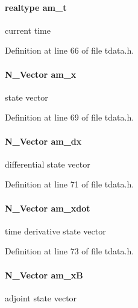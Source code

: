 \paragraph[{am\+\_\+t}]{\setlength{\rightskip}{0pt plus 5cm}realtype am\+\_\+t}\label{struct_temp_data_ae0484650df254ad9cd8883e2ba028892}
current time 

Definition at line 66 of file tdata.\+h.

\hypertarget{struct_temp_data_a4527d9abde45ba3982c35d2c12969d36}{}
\paragraph[{am\+\_\+x}]{\setlength{\rightskip}{0pt plus 5cm}N\+\_\+\+Vector am\+\_\+x}\label{struct_temp_data_a4527d9abde45ba3982c35d2c12969d36}
state vector 

Definition at line 69 of file tdata.\+h.

\hypertarget{struct_temp_data_ac10ec733609d33c557d48c1cc4c9f6f1}{}
\paragraph[{am\+\_\+dx}]{\setlength{\rightskip}{0pt plus 5cm}N\+\_\+\+Vector am\+\_\+dx}\label{struct_temp_data_ac10ec733609d33c557d48c1cc4c9f6f1}
differential state vector 

Definition at line 71 of file tdata.\+h.

\hypertarget{struct_temp_data_abad4a9e3cc9cd42b3fe4e2fe28a915c1}{}
\paragraph[{am\+\_\+xdot}]{\setlength{\rightskip}{0pt plus 5cm}N\+\_\+\+Vector am\+\_\+xdot}\label{struct_temp_data_abad4a9e3cc9cd42b3fe4e2fe28a915c1}
time derivative state vector 

Definition at line 73 of file tdata.\+h.

\hypertarget{struct_temp_data_a318f0b9b1f4b33326184a350912c6fb1}{}
\paragraph[{am\+\_\+x\+B}]{\setlength{\rightskip}{0pt plus 5cm}N\+\_\+\+Vector am\+\_\+x\+B}\label{struct_temp_data_a318f0b9b1f4b33326184a350912c6fb1}
adjoint state vector 


